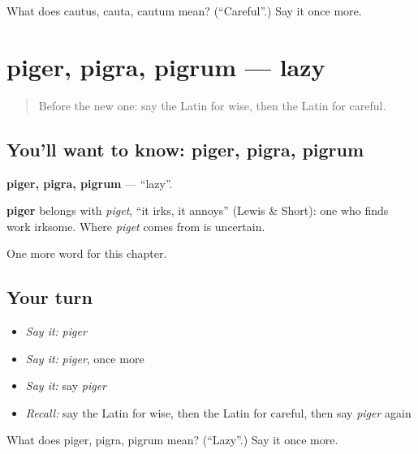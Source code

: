 \begin{tcolorbox}[breakable,colback=teal!4,colframe=teal!35!black,title={Before you move on}]
What does cautus, cauta, cautum mean? (\textquotedblleft{}Careful\textquotedblright{}.) Say it once more.
\end{tcolorbox}
\section[piger, pigra, pigrum]{piger, pigra, pigrum — lazy}

\label{lesson:LA-C150-piger}



\begin{quote}
Before the new one: say the Latin for wise, then the Latin for careful.
\end{quote}

\subsection*{You'll want to know: piger, pigra, pigrum}
\textbf{piger, pigra, pigrum} — \textquotedblleft{}lazy\textquotedblright{}.

\begin{cousinweb}
\textbf{piger} belongs with \emph{piget}, \textquotedblleft{}it irks, it annoys\textquotedblright{} (Lewis \& Short): one who finds work irksome. Where \emph{piget} comes from is uncertain.
\end{cousinweb}

\begin{grammarlens}[title={What you've built}]
One more word for this chapter.
\end{grammarlens}

\subsection*{Your turn}
\begin{itemize}
\raggedright
  \item \emph{Say it:} \emph{piger}
  \item \emph{Say it:} \emph{piger}, once more
  \item \emph{Say it:} say \emph{piger}
  \item \emph{Recall:} say the Latin for wise, then the Latin for careful, then say \emph{piger} again
\end{itemize}

\begin{tcolorbox}[breakable,colback=teal!4,colframe=teal!35!black,title={Before you move on}]
What does piger, pigra, pigrum mean? (\textquotedblleft{}Lazy\textquotedblright{}.) Say it once more.
\end{tcolorbox}
